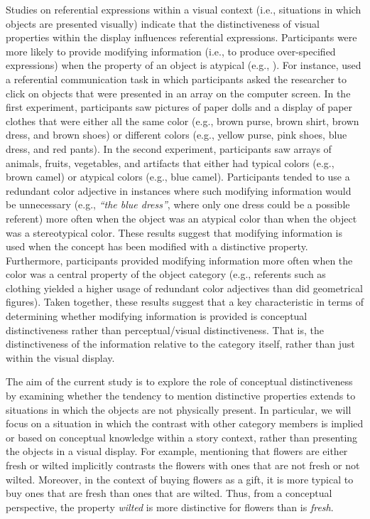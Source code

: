 \documentclass[output=paper]{langsci/langscibook}
\begin{document}
Studies on referential expressions within a visual context (i.e.,
situations in which objects are presented visually) indicate that the
distinctiveness of visual properties within the display influences
referential expressions. Participants were more likely to provide
modifying information (i.e., to produce over-specified expressions)
when the property of an object is atypical (e.g., \citealt{westerbeek2015stored}). For instance, \citet{rubio2016redundant} used a referential
communication task in which participants asked the researcher to click
on objects that were presented in an array on the computer screen. In
the first experiment, participants saw pictures of paper dolls and a
display of paper clothes that were either all the same color (e.g.,
brown purse, brown shirt, brown dress, and brown shoes) or different
colors (e.g., yellow purse, pink shoes, blue dress, and red pants). In
the second experiment, participants saw arrays of animals, fruits, vegetables,
and artifacts that either had typical colors (e.g., brown camel) or
atypical colors (e.g., blue camel).  Participants tended to use a
redundant color adjective in instances where such modifying
information would be unnecessary (e.g., \textit{“the blue dress”},
where only one dress could be a possible referent) more often when the
object was an atypical color than when the object was a stereotypical
color. These results suggest that modifying information is used when
the concept has been modified with a distinctive
property. Furthermore, participants provided modifying information
more often when the color was a central property of the object
category (e.g., referents such as clothing yielded a higher usage of
redundant color adjectives than did geometrical figures). Taken
together, these results suggest that a key characteristic in terms of
determining whether modifying information is provided is conceptual
distinctiveness rather than perceptual/visual distinctiveness.  That
is, the distinctiveness of the information relative to the category
itself, rather than just within the visual display.

The aim of the current study is to explore the role of conceptual
distinctiveness by examining whether the tendency to mention
distinctive properties extends to situations in which the objects are
not physically present. In particular, we will focus on a situation in
which the contrast with other category members is implied or based on
conceptual knowledge within a story context, rather than presenting
the objects in a visual display. For example, mentioning that flowers
are either fresh or wilted implicitly contrasts the flowers with ones
that are not fresh or not wilted. Moreover, in the context of buying
flowers as a gift, it is more typical to buy ones that are fresh than
ones that are wilted. Thus, from a conceptual perspective, the
property \textit{wilted} is more distinctive for flowers than is
\textit{fresh}.
\end{document}
